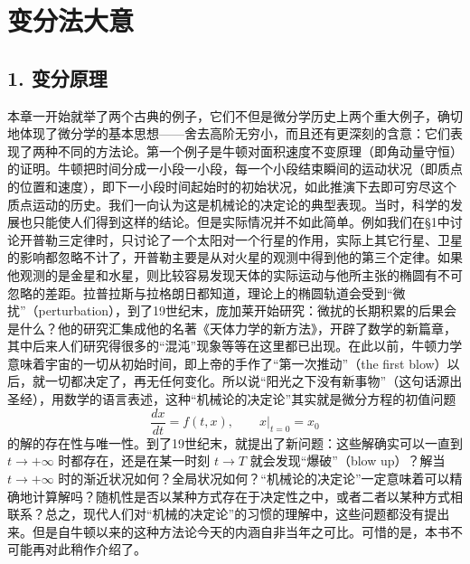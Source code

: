 \section{变分法大意}

\subsection*{1. 变分原理}

本章一开始就举了两个古典的例子，它们不但是微分学历史上两个重大例子，确切地体现了微分学的基本思想——舍去高阶无穷小，而且还有更深刻的含意：它们表现了两种不同的方法论。第一个例子是牛顿对面积速度不变原理（即角动量守恒）的证明。牛顿把时间分成一小段一小段，每一个小段结束瞬间的运动状况（即质点的位置和速度），即下一小段时间起始时的初始状况，如此推演下去即可穷尽这个质点运动的历史。我们一向认为这是机械论的决定论的典型表现。当时，科学的发展也只能使人们得到这样的结论。但是实际情况并不如此简单。例如我们在§1中讨论开普勒三定律时，只讨论了一个太阳对一个行星的作用，实际上其它行星、卫星的影响都忽略不计了，开普勒主要是从对火星的观测中得到他的第三个定律。如果他观测的是金星和水星，则比较容易发现天体的实际运动与他所主张的椭圆有不可忽略的差距。拉普拉斯与拉格朗日都知道，理论上的椭圆轨道会受到“微扰”（perturbation），到了19世纪末，庞加莱开始研究：微扰的长期积累的后果会是什么？他的研究汇集成他的名著《天体力学的新方法》，开辟了数学的新篇章，其中后来人们研究得很多的“混沌”现象等等在这里都已出现。在此以前，牛顿力学意味着宇宙的一切从初始时间，即上帝的手作了“第一次推动”（the first blow）以后，就一切都决定了，再无任何变化。所以说“阳光之下没有新事物”（这句话源出圣经），用数学的语言表述，这种“机械论的决定论”其实就是微分方程的初值问题
\[
 \frac{dx}{dt}=f(t,x),
 \qquad x\big|_{t=0}=x_0
\]
的解的存在性与唯一性。到了19世纪末，就提出了新问题：这些解确实可以一直到 $t\to+\infty$ 时都存在，还是在某一时刻 $t\to T$ 就会发现“爆破”（blow up）？解当 $t\to+\infty$ 时的渐近状况如何？全局状况如何？“机械论的决定论”一定意味着可以精确地计算解吗？随机性是否以某种方式存在于决定性之中，或者二者以某种方式相联系？总之，现代人们对“机械的决定论”的习惯的理解中，这些问题都没有提出来。但是自牛顿以来的这种方法论今天的内涵自非当年之可比。可惜的是，本书不可能再对此稍作介绍了。

